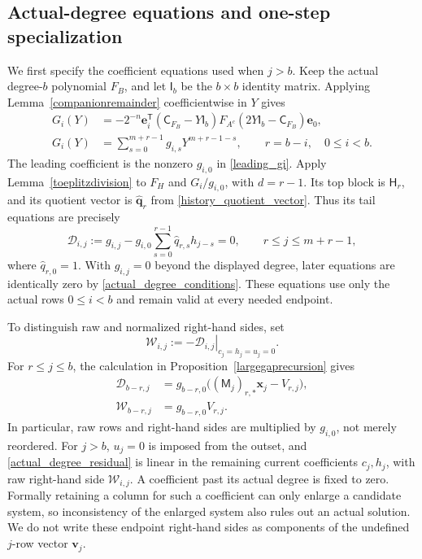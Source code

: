 \documentclass[10pt,a4paper]{amsart}
\begin{document}
\subsection{Actual-degree equations and one-step specialization}\label{app:degreeboundary}

We first specify the coefficient equations used when $j>b$.
Keep the actual degree-$b$ polynomial $F_B$, and let $\mathsf I_b$ be
the $b\times b$ identity matrix.  Applying
Lemma~\ref{companionremainder} coefficientwise in $Y$ gives
\begin{equation}\label{actual_degree_remainder}
 \begin{aligned}
 G_i(Y)&=-2^{-n}\mathbf e_i^{\mathsf T}
  (\mathsf C_{F_B}-Y\mathsf I_b)
  F_{A^c}(2Y\mathsf I_b-\mathsf C_{F_B})\mathbf e_0,\\
 G_i(Y)&=\sum_{s=0}^{m+r-1}g_{i,s}Y^{m+r-1-s},
 \qquad r=b-i,\quad 0\le i<b.
 \end{aligned}
\end{equation}
The leading coefficient is the nonzero $g_{i,0}$ in \eqref{leading_gi}.
Apply Lemma~\ref{toeplitzdivision} to $F_H$ and $G_i/g_{i,0}$, with
$d=r-1$.  Its top block is $\mathsf H_r$, and its quotient vector is
$\widehat{\mathbf q}_r$ from \eqref{history_quotient_vector}.
Thus its tail equations are precisely
\begin{equation}\label{actual_degree_residual}
 \mathcal D_{i,j}:=g_{i,j}
   -g_{i,0}\sum_{s=0}^{r-1}\widehat q_{r,s}h_{j-s}=0,
 \qquad r\le j\le m+r-1,
\end{equation}
where $\widehat q_{r,0}=1$.  With $g_{i,j}=0$ beyond the displayed
degree, later equations are identically zero by
\eqref{actual_degree_conditions}.  These equations use only the
actual rows $0\le i<b$ and remain valid at every needed endpoint.

To distinguish raw and normalized right-hand sides, set
\begin{equation}\label{actual_degree_rhs}
 \mathcal W_{i,j}:=
 -\left.\mathcal D_{i,j}\right|_{c_j=h_j=u_j=0}.
\end{equation}
For $r\le j\le b$, the calculation in
Proposition~\ref{largegaprecursion} gives
\begin{equation}\label{actual_degree_normalization}
 \begin{aligned}
 \mathcal D_{b-r,j}
   &=g_{b-r,0}\bigl((\mathsf M_j)_{r,*}\mathbf x_j-V_{r,j}\bigr),\\
 \mathcal W_{b-r,j}&=g_{b-r,0}V_{r,j}.
 \end{aligned}
\end{equation}
In particular, raw rows and right-hand sides are multiplied by
$g_{i,0}$, not merely reordered.  For $j>b$, $u_j=0$ is imposed from
the outset, and \eqref{actual_degree_residual} is linear in the
remaining current coefficients $c_j,h_j$, with raw right-hand side
$\mathcal W_{i,j}$.  A coefficient past its actual degree is fixed to
zero.  Formally retaining a column for such a coefficient can only
enlarge a candidate system, so inconsistency of the enlarged system also rules out an actual
solution.  We do not write these endpoint
right-hand sides as components of the undefined $j$-row vector
$\mathbf v_j$.
\end{document}
